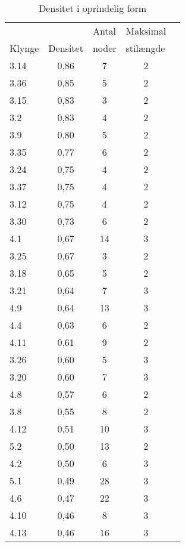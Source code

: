 \begin{table}[H]
  \centering
  \caption{Densitet i oprindelig form}
    \begin{tabular}{lcccr}
          &       & \multicolumn{1}{l}{Antal} & \multicolumn{1}{l}{Maksimal } &  \\
    Klynge & \multicolumn{1}{l}{Densitet} & \multicolumn{1}{l}{noder} & \multicolumn{1}{l}{stilængde} &  \\
\cmidrule{1-4}    3.14  & 0,86  & 7     & 2     &  \\
    3.36  & 0,85  & 5     & 2     &  \\
    3.15  & 0,83  & 3     & 2     &  \\
    3.2   & 0,83  & 4     & 2     &  \\
    3.9   & 0,80  & 5     & 2     &  \\
    3.35  & 0,77  & 6     & 2     &  \\
    3.24  & 0,75  & 4     & 2     &  \\
    3.37  & 0,75  & 4     & 2     &  \\
    3.12  & 0,75  & 4     & 2     &  \\
    3.30  & 0,73  & 6     & 2     &  \\
    4.1   & 0,67  & 14    & 3     &  \\
    3.25  & 0,67  & 3     & 2     &  \\
    3.18  & 0,65  & 5     & 2     &  \\
    3.21  & 0,64  & 7     & 3     &  \\
    4.9   & 0,64  & 13    & 3     &  \\
    4.4   & 0,63  & 6     & 2     &  \\
    4.11  & 0,61  & 9     & 2     &  \\
    3.26  & 0,60  & 5     & 3     &  \\
    3.20  & 0,60  & 7     & 3     &  \\
    4.8   & 0,57  & 6     & 2     &  \\
    3.8   & 0,55  & 8     & 2     &  \\
    4.12  & 0,51  & 10    & 3     &  \\
    5.2   & 0,50  & 13    & 2     &  \\
    4.2   & 0,50  & 6     & 3     &  \\
    5.1   & 0,49  & 28    & 3     &  \\
    4.6   & 0,47  & 22    & 3     &  \\
    4.10  & 0,46  & 8     & 3     &  \\
    4.13  & 0,46  & 16    & 3     &  \\
\cmidrule{1-4}    \end{tabular}%
  \label{tab_app_densitet}%
\end{table}%

